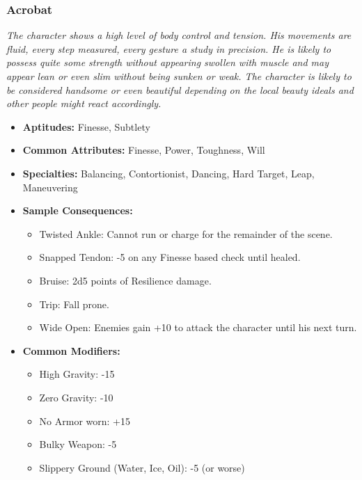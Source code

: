 \subsubsection{Acrobat}\label{Acrobat}
\textit{The character shows a high level of body control and tension. 
His movements are fluid, every step measured, every gesture a study in precision.
He is likely to possess quite some strength without appearing swollen with muscle and may appear lean or even slim without being sunken or weak.
The character is likely to be considered handsome or even beautiful depending on the local beauty ideals and other people might react accordingly.}
\begin{itemize}
	\item \textbf{Aptitudes:} Finesse, Subtlety
	\item \textbf{Common Attributes:} Finesse, Power, Toughness, Will
	\item \textbf{Specialties:} Balancing, Contortionist, Dancing, Hard Target, Leap, Maneuvering
	\item \textbf{Sample Consequences:} 
	\begin{itemize}
		\item Twisted Ankle: Cannot run or charge for the remainder of the scene.
		\item Snapped Tendon: -5 on any Finesse based check until healed.
		\item Bruise: 2d5 points of Resilience damage.
		\item Trip: Fall prone.
		\item Wide Open: Enemies gain +10 to attack the character until his next turn.
	\end{itemize}
	\item \textbf{Common Modifiers:}
	\begin{itemize}
		\item High Gravity: -15
		\item Zero Gravity: -10
		\item No Armor worn: +15
		\item Bulky Weapon: -5
		\item Slippery Ground (Water, Ice, Oil): -5 (or worse)
	\end{itemize}
\end{itemize}

